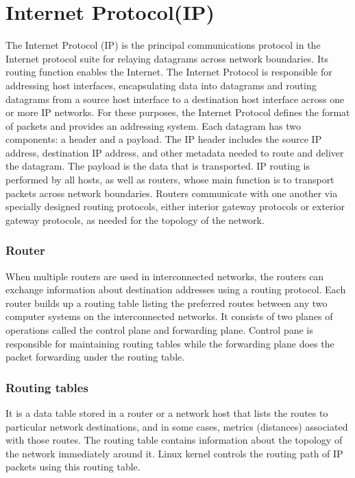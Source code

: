 \section{Internet  Protocol(IP)}
\vspace{12pt}
The Internet  Protocol (IP) is the principal communications protocol in the Internet protocol suite for relaying datagrams across network boundaries. Its routing function enables the Internet.
\vspace{12pt}
The Internet  Protocol is responsible for addressing host interfaces, encapsulating data into datagrams and routing datagrams from a source host interface to a destination host interface across one or more IP networks. For these purposes, the Internet  Protocol defines the format of packets and provides an addressing system.
\vspace{12pt}
Each datagram has two components: a header and a payload. The IP header includes the source IP address, destination IP address, and other metadata needed to route and deliver the datagram. The payload is the data that is transported.
\vspace{12pt}
IP routing is performed by all hosts, as well as routers, whose main function is to transport packets across network boundaries. Routers communicate with one another via specially designed routing protocols, either interior gateway protocols or exterior gateway protocols, as needed for the topology of the network.
\vspace{12pt}
\clearpage
\subsubsection{Router}
\vspace{12pt}
 When multiple routers are used in interconnected networks, the routers can exchange information about destination addresses using a routing protocol. Each router builds up a routing table listing the preferred routes between any two computer systems on the interconnected networks.
 \vspace{12pt}
It consists of two planes of operations called the control plane and forwarding plane. Control pane is responsible for maintaining routing tables while the forwarding plane does the packet forwarding under the routing table.

\vspace{12pt}
\subsubsection{Routing tables}
\vspace{12pt}It is a data table stored in a router or a network host that lists the routes to particular network destinations, and in some cases, metrics (distances) associated with those routes. The routing table contains information about the topology of the network immediately around it. Linux kernel controls the routing path of IP packets using this routing table.
\vspace{12pt}

